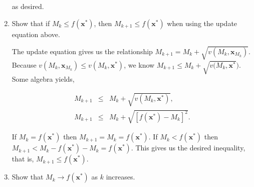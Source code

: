 \documentclass{article}
\begin{document}
\begin{enumerate}
	as desired.
	
	\item \label{step:ineq2} Show that if $M_k \le f(\mathbf{x}^*)$, then $M_{k+1} \le f(\mathbf{x}^*)$ when using the update equation above.
	
	
	The update equation gives us the relationship $M_{k+1} = M_k + \sqrt{v(M_k,\mathbf{x}_{M_k})}$. 
	Because $v(M_k,\mathbf{x}_{M_k}) \le v(M_k,\mathbf{x}^*)$, we know $M_{k+1} \le M_k + \sqrt{v(M_k,\mathbf{x}^*})$.
	Some algebra yields,
	
	\begin{eqnarray*}
		M_{k+1} &\le& M_k + \sqrt{v(M_k,\mathbf{x}^*)},\\
		M_{k+1} &\le& M_k + \sqrt{\left[f(\mathbf{x}^*)-M_k\right]^2}.
	\end{eqnarray*}
	
	If $M_k = f(\mathbf{x}^*)$ then $M_{k+1} = M_k = f(\mathbf{x}^*)$.
	If $M_k < f(\mathbf{x}^*)$ then $M_{k+1} < M_k - f(\mathbf{x}^*) - M_k = f(\mathbf{x}^*)$.
	This gives us the desired inequality, that is, $M_{k+1} \le f(\mathbf{x}^*)$.
	
	\item Show that $M_k \rightarrow f(\mathbf{x}^*)$ as $k$ increases.
	

\end{enumerate}
\end{document}
